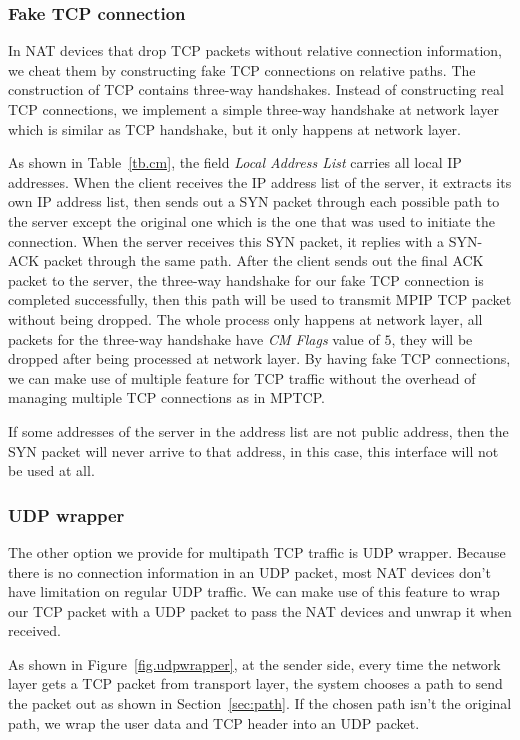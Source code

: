 \subsubsection{Fake TCP connection}
In NAT devices that drop TCP packets without relative connection information, we cheat them by constructing fake TCP connections on relative paths. The construction of TCP contains three-way handshakes. Instead of constructing real TCP connections, we implement a simple three-way handshake at network layer which is similar as TCP handshake, but it only happens at network layer. 

As shown in Table~\ref{tb.cm}, the field \emph{Local Address List} carries all local IP addresses. When the client receives the IP address list of the server, it extracts its own IP address list, then sends out a SYN packet through each possible path to the server except the original one which is the one that was used to initiate the connection. When the server receives this SYN packet, it replies with a SYN-ACK packet through the same path. After the client sends out the final ACK packet to the server, the three-way handshake for our fake TCP connection is completed successfully, then this path will be used to transmit MPIP TCP packet without being dropped. The whole process only happens at network layer, all packets for the three-way handshake have \emph{CM Flags} value of $5$, they will be dropped after being processed at network layer. By having fake TCP connections, we can make use of multiple feature for TCP traffic without the overhead of managing multiple TCP connections as in MPTCP.

If some addresses of the server in the address list are not public address, then the SYN packet will never arrive to that address, in this case, this interface will not be used at all.

\subsubsection{UDP wrapper}
The other option we provide for multipath TCP traffic is UDP wrapper. Because there is no connection information in an UDP packet, most NAT devices don't have limitation on regular UDP traffic. We can make use of this feature to wrap our TCP packet with a UDP packet to pass the NAT devices and unwrap it when received.

As shown in Figure~\ref{fig.udpwrapper}, at the sender side, every time the network layer gets a TCP packet from transport layer, the system chooses a path to send the packet out as shown in Section~\ref{sec:path}. If the chosen path isn't the original path, we wrap the user data and TCP header into an UDP packet.

